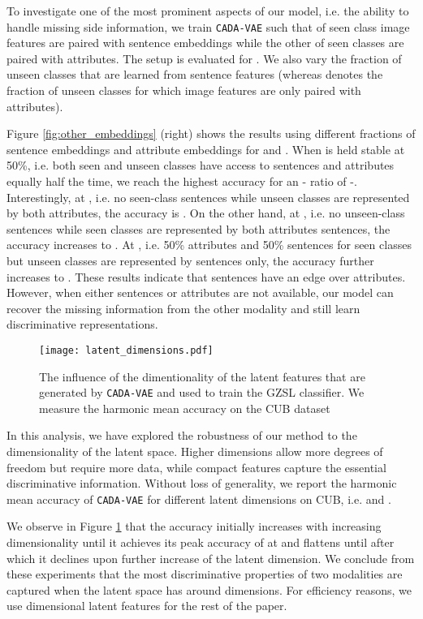 \documentclass[10pt,twocolumn,letterpaper]{article}
\newcommand{\myparagraph}[1]{\vspace{6pt}\noindent{\bf #1}}
\begin{document}
To investigate one of the most prominent aspects of our model, i.e. the ability to handle missing side information, we train \texttt{CADA-VAE} such that  of seen class image features are paired with sentence embeddings while the other  of seen classes are paired with attributes. The setup is evaluated for .
We also vary the fraction  of unseen classes that are learned from sentence features (whereas  denotes the fraction of unseen classes for which image features are only paired with attributes).


Figure \ref{fig:other_embeddings} (right) shows the results using different fractions of sentence embeddings and attribute embeddings for  and . When  is held stable at 50\%, i.e. both seen and unseen classes have access to sentences and attributes equally half the time, we reach the highest accuracy for an - ratio of -. 
Interestingly, at , i.e. no seen-class sentences while unseen classes are represented by both attributes, the accuracy is . On the other hand, at , i.e. no unseen-class sentences while seen classes are represented by both attributes sentences, the accuracy increases to . At , i.e. 50\% attributes and 50\% sentences for seen classes but unseen classes are represented by sentences only, the accuracy further increases to . 
These results indicate that sentences have an edge over attributes. However, when either sentences or attributes are not available, our model can recover the missing information from the other modality and still learn discriminative representations.

\begin{figure}[t]
\centering
\texttt{[image: latent\_dimensions.pdf]}
\caption{The influence of the dimentionality of the latent features that are generated by \texttt{CADA-VAE} and used to train the GZSL classifier. We measure the harmonic mean accuracy on the CUB dataset}
\label{fig:latent_dimenstions}
\end{figure}




\myparagraph{Increasing Number of Latent Dimensions.}
In this analysis, we have explored the robustness of our method to the dimensionality of the latent space. Higher dimensions allow more degrees of freedom but require more data, while compact features capture the essential discriminative information. Without loss of generality, we report the harmonic mean accuracy of \texttt{CADA-VAE} for different latent dimensions on CUB, i.e. 
 and .

We observe in Figure \ref{fig:latent_dimenstions} that the accuracy initially increases with increasing dimensionality until it achieves its peak accuracy of  at  and flattens until  after which it declines upon further increase of the latent dimension. We conclude from these experiments that the most discriminative properties of two modalities are captured when the latent space has around  dimensions. For efficiency reasons, we use  dimensional latent features for the rest of the paper.
\end{document}
